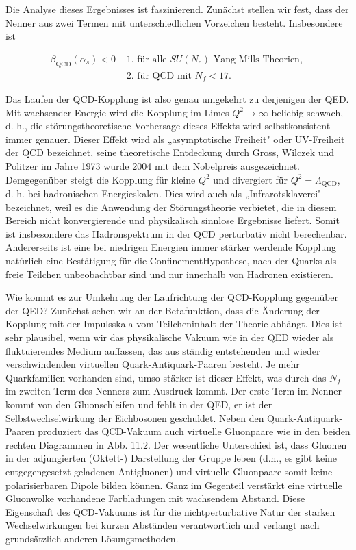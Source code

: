 \documentclass[10pt, letterpaper]{article}
\begin{document}
Die Analyse dieses Ergebnisses ist faszinierend. Zunächst stellen wir fest, dass der Nenner aus zwei Termen mit unterschiedlichen Vorzeichen besteht. Insbesondere ist

$$
\begin{array}{ll}
\beta_{\mathrm{QCD}}\left(\alpha_{s}\right)<0 & \text { 1. für alle } S U\left(N_{c}\right) \text { Yang-Mills-Theorien, } \\
& \text { 2. für QCD mit } N_{f}<17 .
\end{array}
$$

Das Laufen der QCD-Kopplung ist also genau umgekehrt zu derjenigen der QED. Mit wachsender Energie wird die Kopplung im Limes $Q^{2} \rightarrow \infty$ beliebig schwach, d. h., die störungstheoretische Vorhersage dieses Effekts wird selbstkonsistent immer genauer. Dieser Effekt wird als „asymptotische Freiheit" oder UV-Freiheit der QCD bezeichnet, seine theoretische Entdeckung durch Gross, Wilczek und Politzer im Jahre 1973 wurde 2004 mit dem Nobelpreis ausgezeichnet. Demgegenüber steigt die Kopplung für kleine $Q^{2}$ und divergiert für $Q^{2}=\Lambda_{\mathrm{QCD}}$, d. h. bei hadronischen Energieskalen. Dies wird auch als „Infrarotsklaverei" bezeichnet, weil es die Anwendung der Störungstheorie verbietet, die in diesem Bereich nicht konvergierende und physikalisch sinnlose Ergebnisse liefert. Somit ist insbesondere das Hadronspektrum in der QCD perturbativ nicht berechenbar. Andererseits ist eine bei niedrigen Energien immer stärker werdende Kopplung natürlich eine Bestätigung für die ConfinementHypothese, nach der Quarks als freie Teilchen unbeobachtbar sind und nur innerhalb von Hadronen existieren.

Wie kommt es zur Umkehrung der Laufrichtung der QCD-Kopplung gegenüber der QED? Zunächst sehen wir an der Betafunktion, dass die Änderung der Kopplung mit der Impulsskala vom Teilcheninhalt der Theorie abhängt. Dies ist sehr plausibel, wenn wir das physikalische Vakuum wie in der QED wieder als fluktuierendes Medium auffassen, das aus ständig entstehenden und wieder verschwindenden virtuellen Quark-Antiquark-Paaren besteht. Je mehr Quarkfamilien vorhanden sind, umso stärker ist dieser Effekt, was durch das $N_{f}$ im zweiten Term des Nenners zum Ausdruck kommt. Der erste Term im Nenner kommt von den Gluonschleifen und fehlt in der QED, er ist der Selbstwechselwirkung der Eichbosonen geschuldet. Neben den Quark-Antiquark-Paaren produziert das QCD-Vakuum auch virtuelle Gluonpaare wie in den beiden rechten Diagrammen in Abb. 11.2. Der wesentliche Unterschied ist, dass Gluonen in der adjungierten (Oktett-) Darstellung der Gruppe leben (d.h., es gibt keine entgegengesetzt geladenen Antigluonen) und virtuelle Gluonpaare somit keine polarisierbaren Dipole bilden können. Ganz im Gegenteil verstärkt eine virtuelle Gluonwolke vorhandene Farbladungen mit wachsendem Abstand. Diese Eigenschaft des QCD-Vakuums ist für die nichtperturbative Natur der starken Wechselwirkungen bei kurzen Abständen verantwortlich und verlangt nach grundsätzlich anderen Lösungsmethoden.
\end{document}

